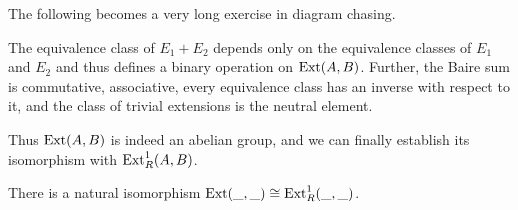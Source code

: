 The following becomes a very long exercise in diagram chasing.
\begin{prop}
    The equivalence class of $E_1+E_2$ depends only on the equivalence classes of $E_1$ and $E_2$ and thus defines a binary operation on $\operatorname{Ext}(A,B)$. Further, the Baire sum is commutative, associative, every equivalence class has an inverse with respect to it, and the class of trivial extensions is the neutral element.
\end{prop}

Thus $\operatorname{Ext}(A,B)$ is indeed an abelian group, and we can finally establish its isomorphism with $\operatorname{Ext}_R^1(A,B)$.

\begin{thm}
    There is a natural isomorphism $\operatorname{Ext}(\_,\_)\cong\operatorname{Ext}^1_R(\_,\_)$.
\end{thm}
